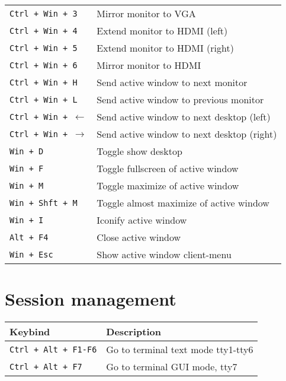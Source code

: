 \documentclass[letterpaper,12pt]{article}
\begin{document}
\begin{table}[H]
\begin{tabular}{|C{5cm}|L{10cm}|}
    {\tt Ctrl + Win + 3} & Mirror monitor to VGA \\
    {\tt Ctrl + Win + 4} & Extend monitor to HDMI (left) \\
    {\tt Ctrl + Win + 5} & Extend monitor to HDMI (right) \\
    {\tt Ctrl + Win + 6} & Mirror monitor to HDMI \\
    {\tt Ctrl + Win + H} & Send active window to next monitor \\
    {\tt Ctrl + Win + L} & Send active window to previous monitor \\
    {\tt Ctrl + Win + $\leftarrow$} & Send active window to next desktop (left) \\
    {\tt Ctrl + Win + $\rightarrow$} & Send active window to next desktop (right) \\
    \hline
    {\tt Win + D} & Toggle show desktop \\
    {\tt Win + F} & Toggle fullscreen of active window \\
    {\tt Win + M} & Toggle maximize of active window \\
    {\tt Win + Shft + M} & Toggle almost maximize of active window \\
    {\tt Win + I} & Iconify active window \\
    {\tt Alt + F4} & Close active window \\
    {\tt Win + Esc} & Show active window client-menu \\
    \hline
  \end{tabular}
\end{table}

\section*{Session management}
\begin{table}[H]
  \begin{tabular}{|C{5cm}|L{10cm}|}
    \hline
    \textbf{Keybind} & \textbf{Description} \\
    \hline
    {\tt Ctrl + Alt + F1-F6} & Go to terminal text mode tty1-tty6 \\
    {\tt Ctrl + Alt + F7} & Go to terminal GUI mode, tty7 \\
    \hline
  \end{tabular}
\end{table}
\end{document}
